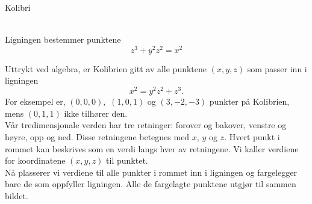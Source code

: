 \documentclass[no]{./../../common/SurferDesc}%
\begin{document}
\footnotesize

\begin{surferPage}
  \begin{surferTitle}Kolibri\end{surferTitle}   \\
Ligningen bestemmer punktene\\
  
  \smallskip
\[z^3+ y^2	z^2	= x^2\]

\singlespacing
Uttrykt ved algebra, er Kolibrien gitt av alle punktene $(x, y, z)$ som passer inn i ligningen
\smallskip
\[ x^2= y^2z^2+z^3.\]
\smallskip
For eksempel er, $(0,0,0),$ $(1,0,1)$ og $(3,-2,-3)$ punkter på Kolibrien, mens $(0,1,1)$ ikke tilhører den.\\
 \singlespacing
Vår tredimensjonale verden har tre retninger: forover og bakover, venstre og høyre, opp og ned. Disse retningene betegnes med $x$, $y$ og $z$. Hvert punkt i rommet kan beskrives som en verdi langs hver av retningene. Vi kaller verdiene for koordinatene $(x,y,z)$ til punktet.\\
\singlespacing
Nå plasserer vi verdiene til alle punkter i rommet inn i ligningen og fargelegger bare de som oppfyller ligningen. Alle de fargelagte punktene utgjør til sammen bildet.\\
\singlespacing


  \begin{surferText}
     \end{surferText}
\end{surferPage}
\end{document}
